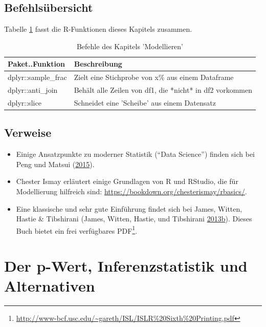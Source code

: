 \documentclass[12pt,ngerman,]{book}
\let\rmarkdownfootnote\footnote%
\def\footnote{\protect\rmarkdownfootnote}
\renewcommand{\href}[2]{#2\footnote{\url{#1}}}
\theoremstyle{definition}
\theoremstyle{definition}
\theoremstyle{remark}
\begin{document}
\section{Befehlsübersicht}\label{befehlsubersicht-5}

Tabelle \ref{tab:befehle-modellieren} fasst die R-Funktionen dieses
Kapitels zusammen.

\begin{table}

\caption{\label{tab:befehle-modellieren}Befehle des Kapitels 'Modellieren'}
\centering
\begin{tabular}[t]{l|l}
\hline
Paket..Funktion & Beschreibung\\
\hline
dplyr::sample\_frac & Zielt eine Stichprobe von x\% aus einem Dataframe\\
\hline
dplyr::anti\_join & Behält alle Zeilen von df1, die *nicht* in df2 vorkommen\\
\hline
dplyr::slice & Schneidet eine 'Scheibe' aus einem Datensatz\\
\hline
\end{tabular}
\end{table}

\section{Verweise}\label{verweise-4}

\begin{itemize}
\item
  Einige Ansatzpunkte zu moderner Statistik (``Data Science'') finden
  sich bei Peng und Matsui (\protect\hyperlink{ref-peng2015art}{2015}).
\item
  Chester Ismay erläutert einige Grundlagen von R und RStudio, die für
  Modellierung hilfreich sind:
  \url{https://bookdown.org/chesterismay/rbasics/}.
\item
  Eine klassische und sehr gute Einführung findet sich bei James,
  Witten, Hastie \& Tibshirani (James, Witten, Hastie, und Tibshirani
  \protect\hyperlink{ref-introstatlearning}{2013}\protect\hyperlink{ref-introstatlearning}{b}).
  Dieses Buch bietet ein
  \href{http://www-bcf.usc.edu/~gareth/ISL/ISLR\%20Sixth\%20Printing.pdf}{frei
  verfügbares PDF}.
\end{itemize}

\chapter{Der p-Wert, Inferenzstatistik und
Alternativen}\label{der-p-wert-inferenzstatistik-und-alternativen}
\end{document}
